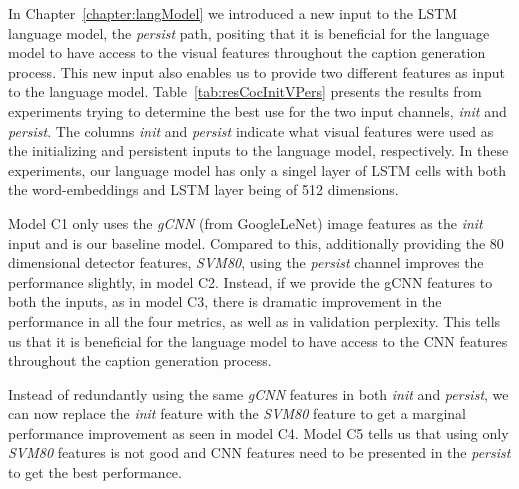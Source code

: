 In Chapter~\ref{chapter:langModel} we introduced a new input to the LSTM language
model, the \emph{persist} path, positing that it is beneficial for the language
model to have access to the visual features throughout the caption generation
process.
This new input also enables us to provide two different features as input to the
language model.
Table~\ref{tab:resCocInitVPers} presents the results from experiments trying to
determine the best use for the two input channels, \emph{init} and
\emph{persist}.
The columns \emph{init} and \emph{persist} indicate what visual features were
used as the initializing and persistent inputs to the language model,
respectively.
In these experiments, our language model has only a singel layer of LSTM cells
with both the word-embeddings and LSTM layer being of 512 dimensions.

Model C1 only uses the \emph{gCNN} (from GoogleLeNet) image features as the
\emph{init} input and is our baseline model.
Compared to this, additionally providing the 80 dimensional detector features,
\emph{SVM80},
using the \emph{persist} channel improves the performance slightly, in model C2.
Instead, if we provide the gCNN features to both the inputs, as in model C3,
there is dramatic improvement in the performance in all the four metrics, as
well as in validation perplexity.
This tells us that it is beneficial for the language model to have access to the
CNN features throughout the caption generation process.

Instead of redundantly using the same \emph{gCNN} features in both \emph{init} and
\emph{persist}, we can now replace the \emph{init} feature with the \emph{SVM80}
feature to get a marginal performance improvement as seen in model C4.
Model C5 tells us that using only \emph{SVM80} features is not good and CNN
features need to be presented in the \emph{persist} to get the best performance. 

